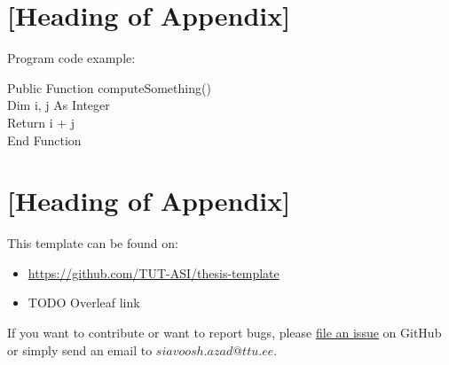 \documentclass{MasterThesisTUT}
\begin{document}
\begin{appendices}
  \renewcommand{\thesection}{\arabic{section} --}

  \section{[Heading of Appendix]}
  Program code example:

  \begin{algorithm}[!ht]
    Public Function computeSomething() \\
    Dim i, j As Integer\\
    Return i + j\\
    End Function\\
    \label{alg:example}
  \end{algorithm}


  \section{[Heading of Appendix]}
  This template can be found on:
  \begin{itemize}
  \item \url{https://github.com/TUT-ASI/thesis-template}
  \item TODO Overleaf link %
  \end{itemize}


  If you want to contribute or want to report bugs, please
  \href{https://github.com/TUT-ASI/thesis-template/issues}{file an issue}
  on GitHub or simply send an email to $siavoosh.azad@ttu.ee$.
\end{appendices}
\end{document}
